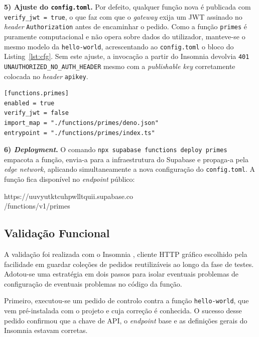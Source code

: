 \documentclass[conference]{IEEEtran}
\begin{document}
\textbf{5) Ajuste do \texttt{config.toml}.} Por defeito, qualquer função nova é publicada com \texttt{verify\_jwt = true}, o que faz com que o \textit{gateway} exija um JWT assinado no \textit{header} \texttt{Authorization} antes de encaminhar o pedido. Como a função \texttt{primes} é puramente computacional e não opera sobre dados do utilizador, manteve-se o mesmo modelo da \texttt{hello-world}, acrescentando ao \texttt{config.toml} o bloco do Listing~\ref{lst:cfg}. Sem este ajuste, a invocação a partir do Insomnia devolvia \texttt{401 UNAUTHORIZED\_NO\_AUTH\_HEADER} mesmo com a \textit{publishable key} corretamente colocada no \textit{header} \texttt{apikey}.

\begin{lstlisting}[language={}, caption={Bloco acrescentado ao \texttt{supabase/config.toml} para permitir a invocação da função apenas com \texttt{apikey}.}, label={lst:cfg}]
[functions.primes]
enabled = true
verify_jwt = false
import_map = "./functions/primes/deno.json"
entrypoint = "./functions/primes/index.ts"
\end{lstlisting}

\textbf{6) \textit{Deployment}.} O comando \texttt{npx supabase functions deploy primes} empacota a função, envia-a para a infraestrutura do Supabase e propaga-a pela \textit{edge network}, aplicando simultaneamente a nova configuração do \texttt{config.toml}. A função fica disponível no \textit{endpoint} público:
\begin{center}\footnotesize\ttfamily
https://uuvyutktcuhpwlltquii.supabase.co\\/functions/v1/primes
\end{center}

\subsection{Validação Funcional}
A validação foi realizada com o Insomnia \cite{insomnia}, cliente HTTP gráfico escolhido pela facilidade em guardar coleções de pedidos reutilizáveis ao longo da fase de testes. Adotou-se uma estratégia em dois passos para isolar eventuais problemas de configuração de eventuais problemas no código da função.

Primeiro, executou-se um pedido de controlo contra a função \texttt{hello-world}, que vem pré-instalada com o projeto e cuja correção é conhecida. O sucesso desse pedido confirmou que a chave de API, o \textit{endpoint} base e as definições gerais do Insomnia estavam corretas.
\end{document}
